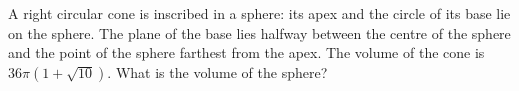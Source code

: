 A right circular cone is inscribed in a sphere: its apex and the circle of its base lie on the sphere. The plane of the base lies halfway between the centre of the sphere and the point of the sphere farthest from the apex. The volume of the cone is $36\pi\left(1+\sqrt{10}\right)$. What is the volume of the sphere?
